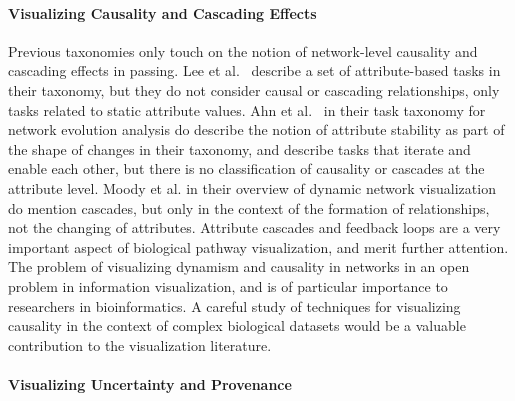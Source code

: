 \documentclass[twocolumn]{bmcart}%
\begin{document}

\paragraph{Visualizing Causality and Cascading Effects}

Previous taxonomies only touch on the notion of network-level causality and cascading effects in passing.
Lee et al.~\cite{Lee2006} describe a set of attribute-based tasks in their taxonomy, but they do not consider causal or cascading relationships, only tasks related to static attribute values.
Ahn et al.~\cite{Ahn2014} in their task taxonomy for network evolution analysis do describe the notion of attribute stability as part of the shape of changes in their taxonomy, and describe tasks that iterate and enable each other, but there is no classification of causality or cascades at the attribute level.
Moody et al. in their overview of dynamic network visualization~\cite{moody2005dynamic} do mention cascades, but only in the context of the formation of relationships, not the changing of attributes.
Attribute cascades and feedback loops are a very important aspect of biological pathway visualization, and merit further attention.
The problem of visualizing dynamism and causality in networks in an open problem in information visualization, and is of particular importance to researchers in bioinformatics.
A careful study of techniques for visualizing causality in the context of complex biological datasets would be a valuable contribution to the visualization literature.

\paragraph{Visualizing Uncertainty and Provenance}
\end{document}
